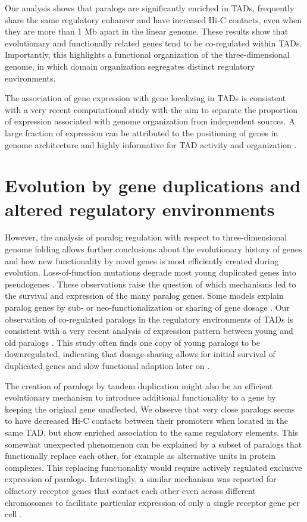 \documentclass[a4paper,twoside=true,openright,parskip=full,chapterprefix=true,11pt,headings=normal,bibliography=totoc,listof=totoc,titlepage=on,captions=tableabove,draft=false]{scrreprt}
\theoremstyle{definition}
\theoremstyle{definition}
\theoremstyle{definition}
\theoremstyle{remark}
\begin{document}
Our analysis shows that paralogs are significantly enriched in TADs,
frequently share the same regulatory enhancer and have increased Hi-C
contacts, even when they are more than 1 Mb apart in the linear genome.
These results show that evolutionary and functionally related genes tend
to be co-regulated within TADs. Importantly, this highlights a
functional organization of the three-dimensional genome, in which domain
organization segregates distinct regulatory environments.

The association of gene expression with gene localizing in TADs is
consistent with a very recent computational study with the aim to
separate the proportion of expression associated with genome
organization from independent sources. A large fraction of expression
can be attributed to the positioning of genes in genome architecture and
highly informative for TAD activity and organization \citep{Rennie2018}.

\hypertarget{evolution-by-gene-duplications-and-altered-regulatory-environments}{%
\section{Evolution by gene duplications and altered regulatory
environments}\label{evolution-by-gene-duplications-and-altered-regulatory-environments}}

However, the analysis of paralog regulation with respect to
three-dimensional genome folding allows further conclusions about the
evolutionary history of genes and how new functionality by novel genes
is most efficiently created during evolution. Loss-of-function mutations
degrade most young duplicated genes into pseudogenes \citep{Lynch2003}.
These observations raise the question of which mechanisms led to the
survival and expression of the many paralog genes. Some models explain
paralog genes by sub- or neo-functionalization or sharing of gene dosage
\citep{Lan2016}. Our observation of co-regulated paralogs in the
regulatory environments of TADs is consistent with a very recent
analysis of expression pattern between young and old paralogs
\citep{Lan2016}. This study often finds one copy of young paralogs to be
downregulated, indicating that dosage-sharing allows for initial
survival of duplicated genes and slow functional adaption later on
\citep{Lan2016}.

The creation of paralogs by tandem duplication might also be an
efficient evolutionary mechanism to introduce additional functionality
to a gene by keeping the original gene unaffected. We observe that very
close paralogs seems to have decreased Hi-C contacts between their
promoters when located in the same TAD, but show enriched association to
the same regulatory elements. This somewhat unexpected phenomenon can be
explained by a subset of paralogs that functionally replace each other,
for example as alternative units in protein complexes. This replacing
functionality would require actively regulated exclusive expression of
paralogs. Interestingly, a similar mechanism was reported for olfactory
receptor genes that contact each other even across different chromosomes
to facilitate particular expression of only a single receptor gene per
cell \citep{Monahan2015, Monahan2017}.
\end{document}
